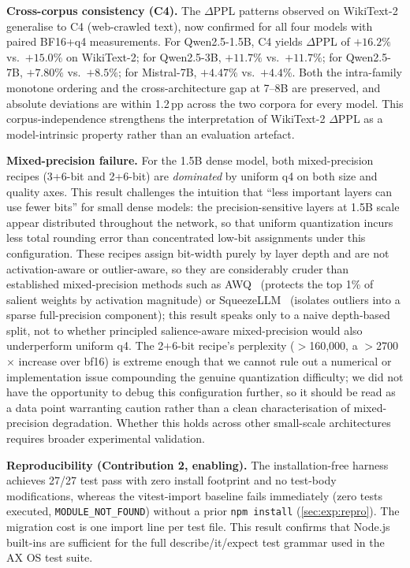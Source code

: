 \documentclass[10pt,twocolumn]{article}
\newcommand{\COBDP}{$+16.2\%$}         %
\newcommand{\CTHDP}{$+11.7\%$}         %
\newcommand{\CSVDP}{$+7.80\%$}         %
\newcommand{\MSDP}{$+4.47\%$}          %
\begin{document}
\textbf{Cross-corpus consistency (C4).}  The $\Delta$PPL patterns observed on
WikiText-2 generalise to C4 (web-crawled text), now confirmed for all four
models with paired BF16+q4 measurements.  For Qwen2.5-1.5B, C4 yields
$\Delta$PPL of \COBDP{} vs.\ $+15.0\%$ on WikiText-2; for Qwen2.5-3B,
\CTHDP{} vs.\ $+11.7\%$; for Qwen2.5-7B, \CSVDP{} vs.\ $+8.5\%$; for
Mistral-7B, \MSDP{} vs.\ $+4.4\%$.  Both the intra-family monotone
ordering and the cross-architecture gap at 7--8B are preserved, and absolute
deviations are within 1.2\,pp across the two corpora for every model.  This
corpus-independence strengthens the interpretation of WikiText-2 $\Delta$PPL
as a model-intrinsic property rather than an evaluation artefact.

\textbf{Mixed-precision failure.}  For the 1.5B dense model, both
mixed-precision recipes (3+6-bit and 2+6-bit) are \emph{dominated} by uniform
q4 on both size and quality axes.  This result challenges the intuition that
``less important layers can use fewer bits'' for small dense models: the
precision-sensitive layers at 1.5B scale appear distributed throughout the
network, so that uniform quantization incurs less total rounding error than
concentrated low-bit assignments under this configuration.  These recipes
assign bit-width purely by layer depth and are not activation-aware or
outlier-aware, so they are considerably cruder than established
mixed-precision methods such as AWQ~\citep{lin2023awq} (protects the top
1\% of salient weights by activation magnitude) or
SqueezeLLM~\citep{kim2024squeezellm} (isolates outliers into a sparse
full-precision component); this result speaks only to a naive depth-based
split, not to whether principled salience-aware mixed-precision would also
underperform uniform q4.  The 2+6-bit recipe's perplexity ($>$160{,}000, a
$>$2700$\times$ increase over bf16) is extreme enough that we cannot rule
out a numerical or implementation issue compounding the genuine quantization
difficulty; we did not have the opportunity to debug this configuration
further, so it should be read as a data point warranting caution rather
than a clean characterisation of mixed-precision degradation.  Whether this
holds across other small-scale architectures requires broader experimental
validation.

\textbf{Reproducibility (Contribution 2, enabling).}  The installation-free harness
achieves 27/27 test pass with zero install footprint and no test-body
modifications, whereas the vitest-import baseline fails immediately (zero
tests executed, \texttt{MODULE\_NOT\_FOUND}) without a prior \texttt{npm install}
(\cref{sec:exp:repro}).  The migration cost is one import line
per test file.  This result confirms that Node.js built-ins are
sufficient for the full describe/it/expect test grammar used in the AX OS test suite.
\end{document}
